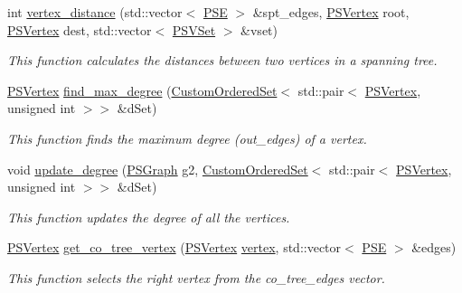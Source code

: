 \begin{DoxyCompactItemize}
int \hyperlink{classport__swapping_a7d72da53b43df36ea443845622bbe5a2}{vertex\+\_\+distance} (std\+::vector$<$ \hyperlink{classport__swapping_ac98b23b7c2dd3f3792327fb666489d66}{P\+SE} $>$ \&spt\+\_\+edges, \hyperlink{classport__swapping_a9588366dd46f9f32aab2c8de93d5679f}{P\+S\+Vertex} root, \hyperlink{classport__swapping_a9588366dd46f9f32aab2c8de93d5679f}{P\+S\+Vertex} dest, std\+::vector$<$ \hyperlink{structport__swapping_1_1PSVSet}{P\+S\+V\+Set} $>$ \&vset)
\begin{DoxyCompactList}\small\item\em This function calculates the distances between two vertices in a spanning tree. \end{DoxyCompactList}\item 
\hyperlink{classport__swapping_a9588366dd46f9f32aab2c8de93d5679f}{P\+S\+Vertex} \hyperlink{classport__swapping_a6f8dd7bd988dfeb3d4e220cff3014c11}{find\+\_\+max\+\_\+degree} (\hyperlink{classCustomOrderedSet}{Custom\+Ordered\+Set}$<$ std\+::pair$<$ \hyperlink{classport__swapping_a9588366dd46f9f32aab2c8de93d5679f}{P\+S\+Vertex}, unsigned int $>$$>$ \&d\+Set)
\begin{DoxyCompactList}\small\item\em This function finds the maximum degree (out\+\_\+edges) of a vertex. \end{DoxyCompactList}\item 
void \hyperlink{classport__swapping_a7c205c3674a0352aa59355348a571579}{update\+\_\+degree} (\hyperlink{classport__swapping_a77c6a219f0b86bd9340d8354e3fff755}{P\+S\+Graph} g2, \hyperlink{classCustomOrderedSet}{Custom\+Ordered\+Set}$<$ std\+::pair$<$ \hyperlink{classport__swapping_a9588366dd46f9f32aab2c8de93d5679f}{P\+S\+Vertex}, unsigned int $>$$>$ \&d\+Set)
\begin{DoxyCompactList}\small\item\em This function updates the degree of all the vertices. \end{DoxyCompactList}\item 
\hyperlink{classport__swapping_a9588366dd46f9f32aab2c8de93d5679f}{P\+S\+Vertex} \hyperlink{classport__swapping_a1d2a299635e0639fe2d892147940dcbf}{get\+\_\+co\+\_\+tree\+\_\+vertex} (\hyperlink{classport__swapping_a9588366dd46f9f32aab2c8de93d5679f}{P\+S\+Vertex} \hyperlink{graph_8hpp_abefdcf0544e601805af44eca032cca14}{vertex}, std\+::vector$<$ \hyperlink{classport__swapping_ac98b23b7c2dd3f3792327fb666489d66}{P\+SE} $>$ \&edges)
\begin{DoxyCompactList}\small\item\em This function selects the right vertex from the co\+\_\+tree\+\_\+edges vector. \end{DoxyCompactList}\item 

\end{DoxyCompactItemize}
